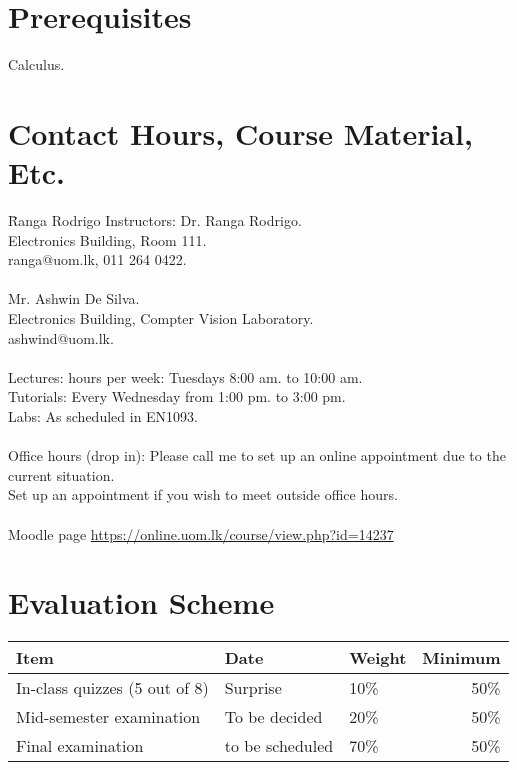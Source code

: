 \documentclass[11pt, a4paper]{article}
\begin{document}
\section{Prerequisites}
Calculus.


\section{Contact Hours, Course Material, Etc.}
\begin{tabbing}
  \hspace{2in}\= Ranga Rodrigo \kill
  Instructors: \>  Dr. Ranga Rodrigo.\\
  \> Electronics Building, Room 111.\\
                \> ranga@uom.lk, 011 264 0422.\\
                \\
                 \>  Mr. Ashwin De Silva.\\
  \> Electronics Building, Compter Vision Laboratory.\\
                \> ashwind@uom.lk.\\
                \\
  Lectures:  hours per week: Tuesdays 8:00 am. to 10:00 am.\\
  Tutorials: \> Every Wednesday from 1:00 pm. to 3:00 pm.\\
  Labs: \> As scheduled in EN1093.\\
  \\
  Office hours (drop in): \> Please call me to set up an online appointment due to the current situation.\\
  \> Set up an appointment if you wish to meet outside office hours.\\
  \\
  Moodle page \>
  \href{https://online.uom.lk/course/view.php?id=14237}{https://online.uom.lk/course/view.php?id=14237}

\end{tabbing}

\section{Evaluation Scheme}
\begin{table}[h!]
\begin{tabular}{@{}lllr@{}}
  \toprule
  Item   & Date& Weight& Minimum\\
  \midrule
  In-class quizzes (5 out of 8) & Surprise & 10\% & 50\%\\

  Mid-semester examination  &  To be decided& 20\% & 50\%\\

  Final examination & to be scheduled & 70\% & 50\%\\
  \bottomrule
\end{tabular}
\end{table}
\end{document}

